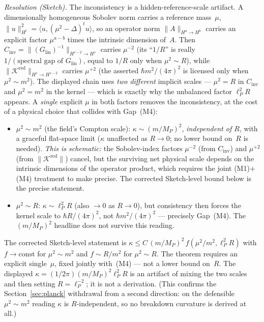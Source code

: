 \documentclass[12pt,a4paper]{article}
\begin{document}
\emph{Resolution (Sketch).} The inconsistency is a hidden-reference-scale artifact. A
dimensionally homogeneous Sobolev norm carries a reference mass~$\mu$, $\|u\|_{H^t}^2 =
\langle u,(\mu^2-\Delta)^t u\rangle$, so an operator norm $\|A\|_{H^a\to H^b}$ carries an
explicit factor $\mu^{a-b}$ times the intrinsic dimension of~$A$. Then $C_{\mathrm{inv}} =
\|(G_{\mathrm{lin}})^{-1}\|_{H^{s-2}\to H^s}$ carries $\mu^{-2}$ (its ``$1/R$'' is really
$1/(\text{spectral gap of }G_{\mathrm{lin}})$, equal to $1/R$ only when $\mu^2\sim R$),
while $\|\mathcal{K}^{\mathrm{red}}\|_{H^s\to H^{s-2}}$ carries $\mu^{+2}$ (the asserted
$\hbar m^2/(4\pi)^2$ is licensed only when $\mu^2\sim m^2$). The displayed chain uses
\emph{two different} implicit scales --- $\mu^2=R$ in $C_{\mathrm{inv}}$ and $\mu^2=m^2$
in the kernel --- which is exactly why the unbalanced factor $\ell_P^2 R$ appears. A
\emph{single} explicit $\mu$ in both factors removes the inconsistency, at the cost of a
physical choice that collides with Gap~(M4):
\begin{itemize}
\item $\mu^2\sim m^2$ (the field's Compton scale): $\kappa\sim(m/M_P)^2$, \emph{independent
of $R$}, with a graceful flat-space limit ($\kappa$ unaffected as $R\to0$; no lower bound
on~$R$ is needed). \emph{This is schematic:} the Sobolev-index factors $\mu^{-2}$ (from
$C_{\mathrm{inv}}$) and $\mu^{+2}$ (from $\|\mathcal{K}^{\mathrm{red}}\|$) cancel, but
the surviving net physical scale depends on the intrinsic dimensions of the operator
product, which requires the joint (M1)$+$(M4) treatment to make precise. The corrected
Sketch-level bound below is the precise statement.
\item $\mu^2\sim R$: $\kappa\sim\ell_P^2 R$ (also $\to0$ as $R\to0$), but consistency then
forces the kernel scale to $\hbar R/(4\pi)^2$, not $\hbar m^2/(4\pi)^2$ --- precisely
Gap~(M4). The $(m/M_P)^2$ headline does not survive this reading.
\end{itemize}
The corrected Sketch-level statement is $\kappa \le C\,(m/M_P)^2\, f(\mu^2/m^2,\ell_P^2 R)$
with $f\to\mathrm{const}$ for $\mu^2\sim m^2$ and $f\sim R/m^2$ for $\mu^2\sim R$. The
theorem requires an explicit single~$\mu$, fixed jointly with~(M4) --- not a lower bound
on~$R$. The displayed $\kappa = (1/2\pi)(m/M_P)^2\ell_P^2 R$ is an artifact of mixing the
two scales and then setting $R=\ell_P^{-2}$; it is not a derivation. (This confirms the
Section~\ref{sec:planck} withdrawal from a second direction: on the defensible $\mu^2\sim
m^2$ reading $\kappa$ is $R$-independent, so no breakdown curvature is derived at all.)
\end{document}
